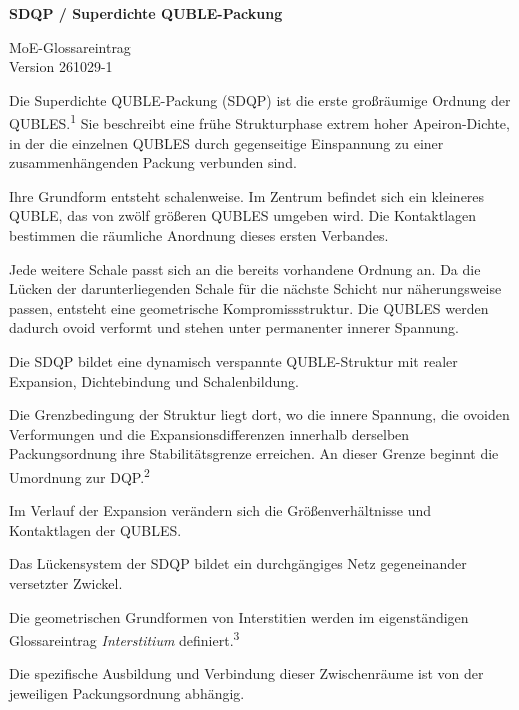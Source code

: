 \documentclass[11pt,a4paper]{article}
\begin{document}
\vspace*{-1.8cm}

\noindent
\begin{minipage}[t]{0.66\textwidth}
{\LARGE\bfseries SDQP / Superdichte QUBLE-Packung}
\end{minipage}
\hfill
\begin{minipage}[t]{0.30\textwidth}
\raggedleft
{\small MoE-Glossareintrag}\\
{\small Version 261029-1}
\end{minipage}

\vspace{1.4em}

Die Superdichte QUBLE-Packung (SDQP) ist die erste
großräumige Ordnung der QUBLES.\textsuperscript{1}
Sie beschreibt eine frühe Strukturphase extrem hoher
Apeiron-Dichte, in der die einzelnen QUBLES durch
gegenseitige Einspannung zu einer zusammenhängenden
Packung verbunden sind.

Ihre Grundform entsteht schalenweise. Im Zentrum
befindet sich ein kleineres QUBLE, das von zwölf
größeren QUBLES umgeben wird. Die Kontaktlagen
bestimmen die räumliche Anordnung dieses ersten
Verbandes.

Jede weitere Schale passt sich an die bereits
vorhandene Ordnung an. Da die Lücken der
darunterliegenden Schale für die nächste Schicht
nur näherungsweise passen, entsteht eine
geometrische Kompromissstruktur. Die QUBLES
werden dadurch ovoid verformt und stehen unter
permanenter innerer Spannung.

Die SDQP bildet eine dynamisch verspannte
QUBLE-Struktur mit realer Expansion,
Dichtebindung und Schalenbildung.

Die Grenzbedingung der Struktur liegt dort, wo
die innere Spannung, die ovoiden Verformungen
und die Expansionsdifferenzen innerhalb
derselben Packungsordnung ihre Stabilitätsgrenze
erreichen. An dieser Grenze beginnt die
Umordnung zur DQP.\textsuperscript{2}

Im Verlauf der Expansion verändern sich die
Größenverhältnisse und Kontaktlagen der QUBLES.

Das Lückensystem der SDQP bildet ein
durchgängiges Netz gegeneinander versetzter
Zwickel.

Die geometrischen Grundformen von Interstitien
werden im eigenständigen Glossareintrag
\emph{Interstitium} definiert.\textsuperscript{3}

Die spezifische Ausbildung und Verbindung
dieser Zwischenräume ist von der jeweiligen
Packungsordnung abhängig.
\end{document}
